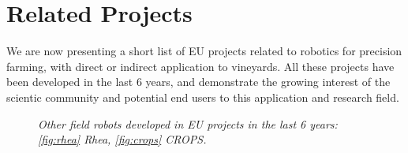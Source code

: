 \section{Related Projects} \label{sec:relatedProjects}

We are now presenting a short list of EU projects related to robotics for precision farming, with direct or indirect application to vineyards. All these projects have been developed in the last 6 years, and demonstrate the growing interest of the scientic community and potential end users to this application and research field.

\begin{figure}
	\centering
	\qquad
	\caption{\textit{Other field robots developed in EU projects in the last 6 years: \ref{fig:rhea} Rhea, \ref{fig:crops} CROPS.}}
\end{figure}

